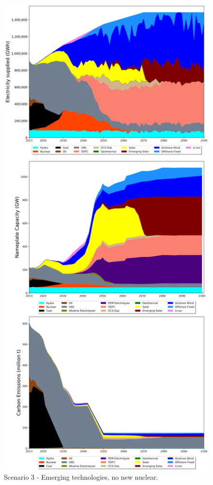 \begin{figure}[h] 
\centering
\vspace*{-3cm}
\includegraphics[scale=0.41]{figures/newtechs_nonuc}
\caption{Scenario 3 - Emerging technologies, no new nuclear.}
\label{scen3}
\end{figure}

